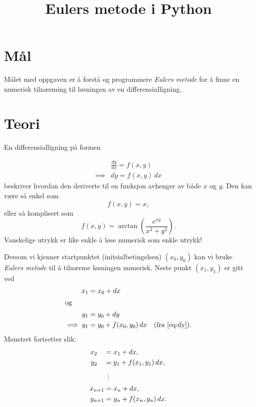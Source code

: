 \documentclass[a4paper,12pt]{article}
\title{Eulers metode i Python}
\author{}
\date{}
\begin{document}
\maketitle

\section*{Mål}
Målet med oppgaven er å forstå og programmere \textit{Eulers metode} for å finne en numerisk tilnærming til løsningen av en differensialligning.

\section*{Teori}

En differensialligning på formen

\begin{subequations}
\begin{align}
&\frac{dy}{dx} = f(x,y) \\
\implies &dy = f(x,y) \, dx
\label{eq:dy}
\end{align}
\end{subequations}
beskriver hvordan den deriverte til en funksjon avhenger av både $x$ og $y$. Den kan være så enkel som
\[
f(x,y) = x,
\]
eller så komplisert som
\begin{equation}
\label{eq:vanskelig}
f(x,y) = \arctan{\left( \frac{e^{xy}}{x^2+y^2} \right)}.
\end{equation}
Vanskelige utrykk er like enkle å løse numerisk som enkle utrykk!
\newline

Dersom vi kjenner startpunktet (initsialbetingelsen) $(x_0,y_0)$ kan vi bruke \textit{Eulers metode} til å tilnærme løsningen numerisk. Neste punkt $(x_1,y_1)$ er gitt ved
\begin{subequations}
\label{eq:step1}
\begin{align}
x_1 &= x_0 + dx \\
\intertext{og}
y_1 &= y_0 + dy \\
\implies y_1 &= y_0 + f(x_0,y_0)\, dx \quad (\text{fra \eqref{eq:dy}}).
\end{align}
\end{subequations}
Mønstret fortsetter slik:
\begin{subequations}
\begin{align}
x_{2\phantom{+1}}     &= x_1 + dx, \\
y_{2\phantom{+1}}     &= y_1 + f(x_1,y_1)\, dx,\\
&\, \, \, \vdots  \notag\\
x_{n+1} &= x_n + dx, \\
y_{n+1} &= y_n + f(x_n,y_n)\, dx.
\end{align}
\end{subequations}
\end{document}
